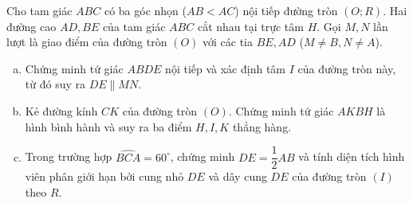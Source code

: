 \begin{bt}%
Cho tam giác $ABC$ có ba góc nhọn ($AB < AC$) nội tiếp đường tròn $(O; R)$. Hai đường cao $AD, BE$ của tam giác $ABC$ cắt nhau tại trực tâm $H$. Gọi $M, N$ lần lượt là giao điểm của đường tròn $(O)$ với các tia $BE, AD$ ($M \neq B, N \neq A$).
\begin{enumerate}[a)]
	\item Chứng minh tứ giác $ABDE$ nội tiếp và xác định tâm $I$ của đường tròn này, từ đó suy ra $DE \parallel MN$.
	\item Kẻ đường kính $CK$ của đường tròn $(O)$. Chứng minh tứ giác $AKBH$ là hình bình hành và suy ra ba điểm $H, I, K$ thẳng hàng.
	\item Trong trường hợp $\widehat{BCA} = 60^\circ$, chứng minh $DE = \dfrac{1}{2}AB$ và tính diện tích hình viên phân giới hạn bởi cung nhỏ $DE$ và dây cung $DE$ của đường tròn $(I)$ theo $R$.
\end{enumerate}
\end{bt}
